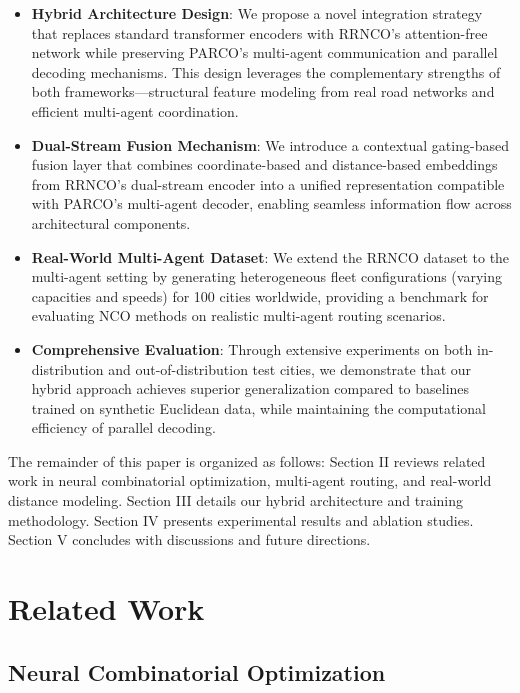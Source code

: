 \documentclass[lettersize,journal]{IEEEtran}
\begin{document}
\begin{itemize}
\item \textbf{Hybrid Architecture Design}: We propose a novel integration strategy that replaces standard transformer encoders with RRNCO's attention-free network while preserving PARCO's multi-agent communication and parallel decoding mechanisms. This design leverages the complementary strengths of both frameworks—structural feature modeling from real road networks and efficient multi-agent coordination.

\item \textbf{Dual-Stream Fusion Mechanism}: We introduce a contextual gating-based fusion layer that combines coordinate-based and distance-based embeddings from RRNCO's dual-stream encoder into a unified representation compatible with PARCO's multi-agent decoder, enabling seamless information flow across architectural components.

\item \textbf{Real-World Multi-Agent Dataset}: We extend the RRNCO dataset to the multi-agent setting by generating heterogeneous fleet configurations (varying capacities and speeds) for 100 cities worldwide, providing a benchmark for evaluating NCO methods on realistic multi-agent routing scenarios.

\item \textbf{Comprehensive Evaluation}: Through extensive experiments on both in-distribution and out-of-distribution test cities, we demonstrate that our hybrid approach achieves superior generalization compared to baselines trained on synthetic Euclidean data, while maintaining the computational efficiency of parallel decoding.
\end{itemize}

The remainder of this paper is organized as follows: Section II reviews related work in neural combinatorial optimization, multi-agent routing, and real-world distance modeling. Section III details our hybrid architecture and training methodology. Section IV presents experimental results and ablation studies. Section V concludes with discussions and future directions.

\section{Related Work}

\subsection{Neural Combinatorial Optimization}
\end{document}

